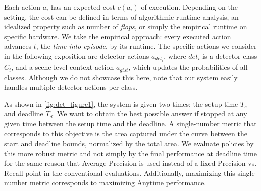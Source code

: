 Each action $a_i$ has an expected cost $c(a_i)$ of execution.
Depending on the setting, the cost can be defined in terms of algorithmic runtime analysis, an idealized property such as number of \emph{flops}, or simply the empirical runtime on specific hardware.
We take the empirical approach: every executed action advances $t$, the \emph{time into episode}, by its runtime.
The specific actions we consider in the following exposition are detector actions $a_{{det}_i}$, where ${det}_i$ is a detector class $C_i$, and a scene-level context action $a_{gist}$, which updates the probabilities of all classes.
Although we do not showcase this here, note that our system easily handles multiple detector actions per class.

As shown in \autoref{fig:det_figure1}, the system is given two times: the setup time $T_s$ and deadline $T_d$.
We want to obtain the best possible answer if stopped at any given time between the setup time and the deadline.
A single-number metric that corresponds to this objective is the area captured under the curve between the start and deadline bounds, normalized by the total area.
We evaluate policies by this more robust metric and not simply by the final performance at deadline time for the same reason that Average Precision is used instead of a fixed Precision vs. Recall point in the conventional evaluations.
Additionally, maximizing this single-number metric corresponds to maximizing Anytime performance.
